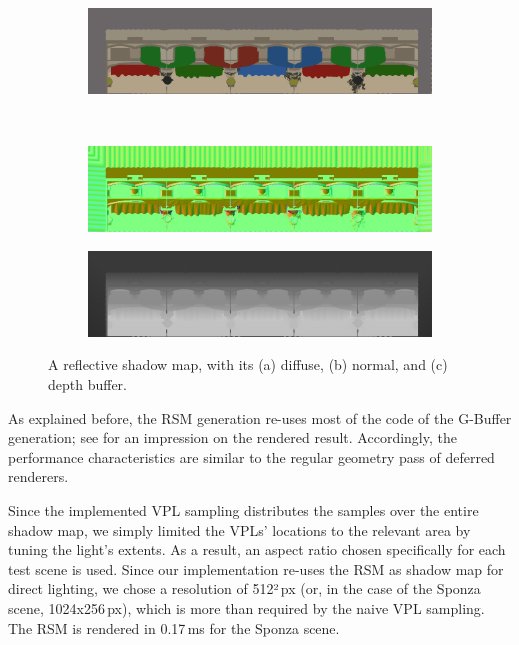 \begin{figure}[htb]
    \centering
    \begin{subfigure}[b]{1.0\textwidth}
        \centering
        \includegraphics[width=1.0\linewidth]{screenshots/RSM_diffuse}%
        \caption{}
    \end{subfigure}\\
    \par\medskip
    \begin{subfigure}[b]{0.49\textwidth}
        \centering
        \includegraphics[width=1.0\linewidth]{screenshots/RSM_normal}%
        \caption{}
    \end{subfigure}%
    \hfill
    \begin{subfigure}[b]{0.49\textwidth}
        \centering
        \includegraphics[width=1.0\linewidth]{screenshots/RSM_depth}%
        \caption{}
    \end{subfigure}%
    \caption{A reflective shadow map, with its (a) diffuse, (b) normal, and (c) depth buffer.}
    \label{fig:results:RSMBuffers}%
\end{figure}%

\noindent
As explained before, the RSM generation re-uses most of the code of the G-Buffer generation; see  for an impression on the rendered result. Accordingly, the performance characteristics are similar to the regular geometry pass of deferred renderers.

Since the implemented VPL sampling distributes the samples over the entire shadow map, we simply limited the VPLs' locations to the relevant area by tuning the light's extents. As a result, an aspect ratio chosen specifically for each test scene is used. Since our implementation re-uses the RSM as shadow map for direct lighting, we chose a resolution of 512²\,px (or, in the case of the Sponza scene, 1024x256\,px), which is more than required by the naive VPL sampling. The RSM is rendered in 0.17\,ms for the Sponza scene.

